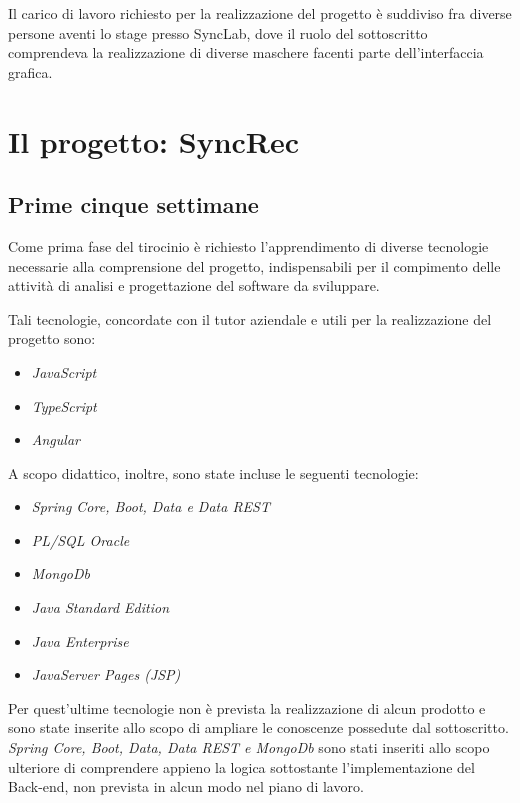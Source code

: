 Il carico di lavoro richiesto per la realizzazione del progetto è suddiviso fra diverse persone aventi lo stage presso SyncLab, dove il ruolo del sottoscritto comprendeva la realizzazione di diverse maschere facenti parte dell'interfaccia grafica.\\

\section{Il progetto: SyncRec}\label{ch-2.2}
\subsection{Prime cinque settimane}
Come prima fase del tirocinio è richiesto l'apprendimento di diverse tecnologie necessarie alla comprensione del progetto,  indispensabili per il compimento delle attività di analisi e progettazione del software da sviluppare.

Tali tecnologie, concordate con il tutor aziendale e utili per la realizzazione del progetto sono:
\begin{itemize}
	\item \textit{JavaScript}
	\item \textit{TypeScript}
	\item \textit{Angular}
\end{itemize}

A scopo didattico, inoltre, sono state incluse le seguenti tecnologie:
\begin{itemize}
	\item \textit{Spring Core, Boot, Data e Data REST}
	\item \textit{PL/SQL Oracle}
	\item \textit{MongoDb}
	\item \textit{Java Standard Edition}
	\item \textit{Java Enterprise}
	\item \textit{JavaServer Pages (JSP)}
\end{itemize}


Per quest'ultime tecnologie non è prevista la realizzazione di alcun prodotto e sono state inserite allo scopo di ampliare le conoscenze possedute dal sottoscritto.\\
\textit{Spring Core, Boot, Data, Data REST e MongoDb} sono stati inseriti allo scopo ulteriore di comprendere appieno la logica sottostante l'implementazione del Back-end, non prevista in alcun modo nel piano di lavoro.\\


